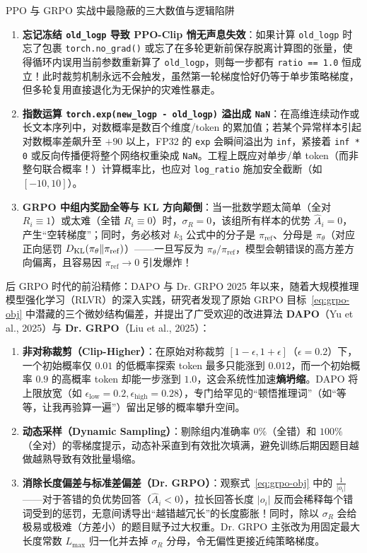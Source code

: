 \begin{failBox}{PPO 与 GRPO 实战中最隐蔽的三大数值与逻辑陷阱}
\begin{enumerate}
  \item \textbf{忘记冻结 \texttt{old\_logp} 导致 PPO-Clip 悄无声息失效}：如果计算 \texttt{old\_logp} 时忘了包裹 \texttt{torch.no\_grad()} 或忘了在多轮更新前保存脱离计算图的张量，使得循环内误用当前参数重新算了 \texttt{old\_logp}，则每一步都有 \texttt{ratio == 1.0} 恒成立！此时裁剪机制永远不会触发，虽然第一轮梯度恰好仍等于单步策略梯度，但多轮复用直接退化为无保护的灾难性暴走。
  \item \textbf{指数运算 \texttt{torch.exp(new\_logp - old\_logp)} 溢出成 \texttt{NaN}}：在高维连续动作或长文本序列中，对数概率是数百个维度/token 的累加值；若某个异常样本引起对数概率差飙升至 $+90$ 以上，FP32 的 \texttt{exp} 会瞬间溢出为 \texttt{inf}，紧接着 \texttt{inf * 0} 或反向传播便将整个网络权重染成 \texttt{NaN}。工程上既应对单步/单 token（而非整句联合概率！）计算概率比，也应对 \texttt{log\_ratio} 施加安全截断（如 $[-10, 10]$）。
  \item \textbf{GRPO 中组内奖励全等与 KL 方向颠倒}：当一批数学题太简单（全对 $R_i \equiv 1$）或太难（全错 $R_i \equiv 0$）时，$\sigma_R = 0$，该组所有样本的优势 $\hat{A}_i = 0$，产生“空转梯度”；同时，务必核对 $k_3$ 公式中的分子是 $\pi_{\mathrm{ref}}$、分母是 $\pi_\theta$（对应正向惩罚 $D_{\mathrm{KL}}(\pi_\theta \| \pi_{\mathrm{ref}})$）——一旦写反为 $\pi_\theta / \pi_{\mathrm{ref}}$，模型会朝错误的高方差方向偏离，且容易因 $\pi_{\mathrm{ref}} \to 0$ 引发爆炸！
\end{enumerate}
\end{failBox}

\begin{extBox}{后 GRPO 时代的前沿精修：DAPO 与 Dr. GRPO}
2025 年以来，随着大规模推理模型强化学习（RLVR）的深入实践，研究者发现了原始 GRPO 目标~\eqref{eq:grpo-obj} 中潜藏的三个微妙结构偏差，并提出了广受欢迎的改进算法 \textbf{DAPO}（Yu et al., 2025）与 \textbf{Dr. GRPO}（Liu et al., 2025）：
\begin{enumerate}
  \item \textbf{非对称裁剪（Clip-Higher）}：在原始对称裁剪 $[1-\epsilon, 1+\epsilon]$（$\epsilon=0.2$）下，一个初始概率仅 $0.01$ 的低概率探索 token 最多只能涨到 $0.012$，而一个初始概率 $0.9$ 的高概率 token 却能一步涨到 $1.0$，这会系统性加速\textbf{熵坍缩}。DAPO 将上限放宽（如 $\epsilon_{\mathrm{low}} = 0.2, \epsilon_{\mathrm{high}} = 0.28$），专门给罕见的“顿悟推理词”（如“等等，让我再验算一遍”）留出足够的概率攀升空间。
  \item \textbf{动态采样（Dynamic Sampling）}：剔除组内准确率 $0\%$（全错）和 $100\%$（全对）的零梯度提示，动态补采直到有效批次填满，避免训练后期因题目越做越熟导致有效批量塌缩。
  \item \textbf{消除长度偏差与标准差偏差（Dr. GRPO）}：观察式~\eqref{eq:grpo-obj} 中的 $\frac{1}{|o_i|}$——对于答错的负优势回答（$\hat{A}_i < 0$），拉长回答长度 $|o_i|$ 反而会稀释每个错词受到的惩罚，无意间诱导出“越错越冗长”的长度膨胀！同时，除以 $\sigma_R$ 会给极易或极难（方差小）的题目赋予过大权重。Dr. GRPO 主张改为用固定最大长度常数 $L_{\max}$ 归一化并去掉 $\sigma_R$ 分母，令无偏性更接近纯策略梯度。
\end{enumerate}
\end{extBox}

